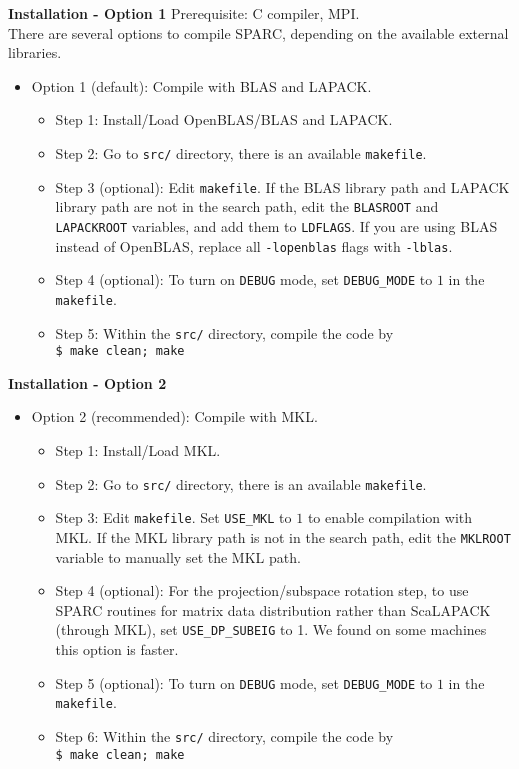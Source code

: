 \begin{frame}{\textbf{Installation - Option 1}} \label{Installation:1}
Prerequisite: C compiler, MPI.\\
There are several options to compile SPARC, depending on the available external libraries.
\begin{itemize}
\item Option 1 (default): Compile with BLAS and LAPACK.
	\begin{itemize}
		\item Step 1: Install/Load OpenBLAS/BLAS and LAPACK.
		\item Step 2: Go to \texttt{src/} directory, there is an available \texttt{makefile}.
		\item Step 3 (optional): Edit \texttt{makefile}. If the BLAS library path and LAPACK library path are not in the search path, edit the \texttt{BLASROOT} and \texttt{LAPACKROOT} variables, and add them to \texttt{LDFLAGS}. If you are using BLAS instead of OpenBLAS, replace all \texttt{-lopenblas} flags with \texttt{-lblas}.
		\item Step 4 (optional): To turn on \texttt{DEBUG} mode, set \texttt{DEBUG\_MODE} to $1$ in the \texttt{makefile}.
		\item Step 5: Within the \texttt{src/} directory, compile the code by \\
		      \texttt{\$ make clean; make}
	\end{itemize}
\end{itemize}
\end{frame}

\begin{frame}{\textbf{Installation - Option 2}} \label{Installation:2}

\begin{itemize}
\item Option 2 (recommended): Compile with MKL.
	\begin{itemize}
		\item Step 1: Install/Load MKL.
		\item Step 2: Go to \texttt{src/} directory, there is an available \texttt{makefile}.
		\item Step 3: Edit \texttt{makefile}. Set \texttt{USE\_MKL} to $1$ to enable compilation with MKL. If the MKL library path is not in the search path, edit the \texttt{MKLROOT} variable to manually set the MKL path.
		\item Step 4 (optional): For the projection/subspace rotation step, to use SPARC routines for matrix data distribution rather than ScaLAPACK (through MKL), set \texttt{USE\_DP\_SUBEIG} to 1. We found on some machines this option is faster.
		\item Step 5 (optional): To turn on \texttt{DEBUG} mode, set \texttt{DEBUG\_MODE} to $1$ in the \texttt{makefile}.
		\item Step 6: Within the \texttt{src/} directory, compile the code by \\
		      \texttt{\$ make clean; make}
	\end{itemize}
\end{itemize}

\end{frame}


